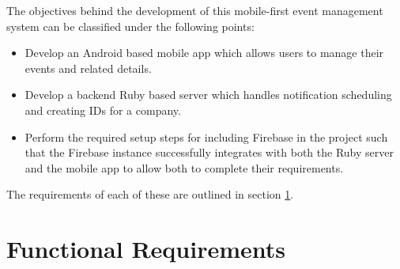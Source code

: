 The objectives behind the development of this mobile-first event management system can be classified under the following points:

\begin{itemize}
    \item Develop an Android based mobile app which allows users to manage their events and related details.
    \item Develop a backend Ruby based server which handles notification scheduling and creating IDs for a company.
    \item Perform the required setup steps for including Firebase in the project such that the Firebase instance successfully integrates with both the Ruby server and the mobile app to allow both to complete their requirements.
\end{itemize}

The requirements of each of these are outlined in section \ref{section:functionalreq}.

\section{Functional Requirements}
\label{section:functionalreq}




